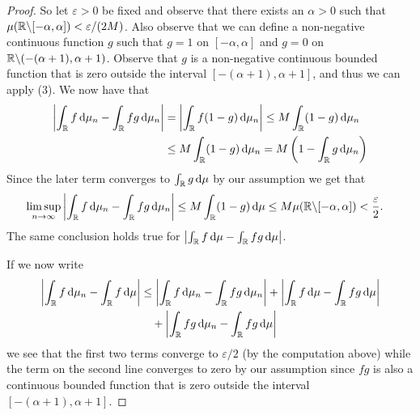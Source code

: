 \begin{proof}
So let $\varepsilon > 0$ be fixed and observe that there exists an $\alpha > 0$ such that $\mu(\mathbb R \backslash [-\alpha, \alpha]) < \varepsilon/(2M)$. Also observe that we can define a non-negative continuous function $g$ such that $g = 1$ on $[-\alpha, \alpha]$ and $g = 0$ on $\mathbb R \backslash (-(\alpha+1),\alpha+1)$. Observe that $g$ is a non-negative continuous bounded function that is zero outside the interval $[-(\alpha+1), \alpha+1]$, and thus we can apply (3). We now have that
\begin{align*}
	\left|\int_{\mathbb R} f \, \mathrm{d} \mu_n - \int_{\mathbb R} fg \, \mathrm{d} \mu_n\right|
	&= \left|\int_{\mathbb R} f (1-g) \, \mathrm{d} \mu_n\right| \le M \int_{\mathbb R} (1-g) \, \mathrm{d} \mu_n \\
	&\le M \int_{\mathbb R} (1-g) \, \mathrm{d} \mu_n = M\left(1-\int_{\mathbb R} g \, \mathrm{d} \mu_n\right)
\end{align*}
Since the later term converges to $\int_{\mathbb R} g \, \mathrm{d} \mu$ by our assumption we get that
\begin{align*}
	\limsup_{n \to \infty} \left|\int_{\mathbb R} f \, \mathrm{d} \mu_n - \int_{\mathbb R} fg \, \mathrm{d} \mu_n\right|
	&\le M \int_{\mathbb R} (1-g) \, \mathrm{d} \mu \le M \mu(\mathbb R \backslash [-\alpha,\alpha]) < \frac{\varepsilon}{2}.
\end{align*}
The same conclusion holds true for $\left|\int_{\mathbb R} f \, \mathrm{d} \mu - \int_{\mathbb R} fg \, \mathrm{d} \mu\right|$.

If we now write
\begin{align*}
	\left|\int_{\mathbb R} f \, \mathrm{d} \mu_n - \int_{\mathbb R} f \, \mathrm{d} \mu\right| &\le \left|\int_{\mathbb R} f \, \mathrm{d} \mu_n - \int_{\mathbb R} fg \, \mathrm{d} \mu_n\right| + \left|\int_{\mathbb R} f \, \mathrm{d} \mu - \int_{\mathbb R} fg \, \mathrm{d} \mu\right|\\ &\hspace{10pt}+ \left|\int_{\mathbb R} fg \, \mathrm{d} \mu_n - \int_{\mathbb R} fg \, \mathrm{d} \mu\right|
\end{align*}
we see that the first two terms converge to $\varepsilon/2$ (by the computation above) while the term on the second line converges to zero by our assumption since $fg$ is also a continuous bounded function that is zero outside the interval $[-(\alpha+1),\alpha+1]$. 
\end{proof}

